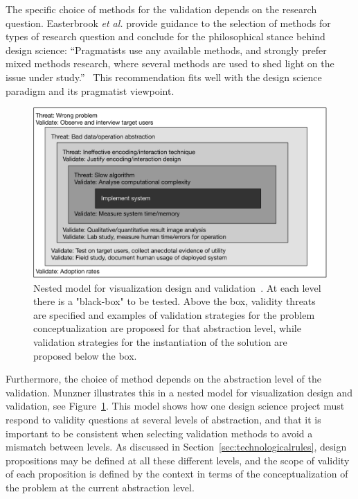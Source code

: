 \documentclass[graybox]{svmult}
\begin{document}
The specific choice of methods for the validation depends on the research question. Easterbrook \emph{et al.} provide guidance to the selection of methods for types of research question and conclude for the philosophical stance behind design science: ``Pragmatists use any available methods, and strongly prefer mixed methods research, where several methods are used to shed light on the issue under study.''~\cite{easterbrook_selecting_2008} 
This recommendation fits well with the design science paradigm and its pragmatist viewpoint.

\begin{figure}[t]
  \includegraphics[width=\textwidth]{Figures/nested_model.pdf}
\caption{Nested model for visualization design and validation~\cite{munzner2009}. At each level there is a "black-box" to be tested. Above the box, validity threats are specified and examples of validation strategies for the problem conceptualization are proposed for that abstraction level, while validation strategies for the instantiation of the solution are proposed below the box.}\label{fig:nested_model}       %
\end{figure} 

Furthermore, the choice of method depends on the abstraction level of the validation. Munzner illustrates this in a nested model for visualization design and validation, see Figure~\ref{fig:nested_model}. This model shows how one design science project must respond to validity questions at several levels of abstraction, and that it is important to be consistent when selecting validation methods to avoid a mismatch between levels. As discussed in Section~\ref{sec:technologicalrules}, design propositions may be defined at all these different levels, and the scope of validity of each proposition is defined by the context in terms of the conceptualization of the problem at the current abstraction level.
\end{document}

